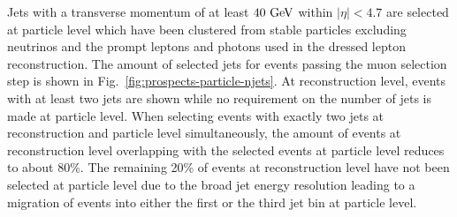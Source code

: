 
Jets with a transverse momentum of at least $40~\textrm{GeV}$ within $|\eta|<4.7$ are selected at particle level which have been clustered from stable particles excluding neutrinos and the prompt leptons and photons used in the dressed lepton reconstruction. The amount of selected jets for events passing the muon selection step is shown in Fig.~\ref{fig:prospects-particle-njets}. At reconstruction level, events with at least two jets are shown while no requirement on the number of jets is made at particle level. When selecting events with exactly two jets at reconstruction and particle level simultaneously, the amount of events at reconstruction level overlapping with the selected events at particle level reduces to about 80\%. The remaining 20\% of events at reconstruction level have not been selected at particle level due to the broad jet energy resolution leading to a migration of events into either the first or the third jet bin at particle level.

